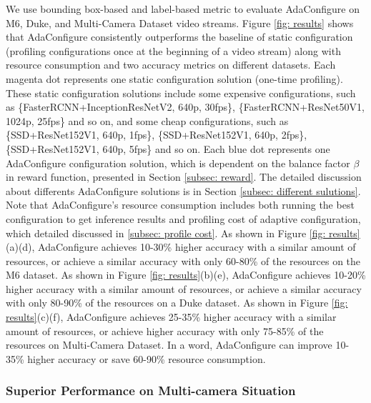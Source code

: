 We use bounding box-based and label-based metric to evaluate AdaConfigure on M6, Duke, and Multi-Camera Dataset video streams. Figure \ref{fig: results} shows that AdaConfigure consistently outperforms the baseline of static configuration (profiling configurations once at the beginning of a video stream) along with resource consumption and two accuracy metrics on different datasets. Each magenta dot represents one static configuration solution (one-time profiling). These static configuration solutions include some expensive configurations, such as \{FasterRCNN+InceptionResNetV2, 640p, 30fps\}, \{FasterRCNN+ResNet50V1, 1024p, 25fps\} and so on, and some cheap configurations, such as \{SSD+ResNet152V1, 640p, 1fps\}, \{SSD+ResNet152V1, 640p, 2fps\}, \{SSD+ResNet152V1, 640p, 5fps\} and so on. Each blue dot represents one AdaConfigure configuration solution, which is dependent on the balance factor $\beta$ in reward function, presented in Section \ref{subsec: reward}. The detailed discussion about differents AdaConfigure solutions is in Section \ref{subsec: different sulutions}. Note that AdaConfigure's resource consumption includes both running the best configuration to get inference results and profiling cost of adaptive configuration, which detailed discussed in \ref{subsec: profile cost}. As shown in Figure \ref{fig: results}(a)(d), AdaConfigure achieves 10-30\% higher accuracy with a similar amount of resources, or achieve a similar accuracy with only 60-80\% of the resources on the M6 dataset. As shown in Figure \ref{fig: results}(b)(e), AdaConfigure achieves 10-20\% higher accuracy with a similar amount of resources, or achieve a similar accuracy with only 80-90\% of the resources on a Duke dataset. As shown in Figure \ref{fig: results}(c)(f), AdaConfigure achieves 25-35\% higher accuracy with a similar amount of resources, or achieve higher accuracy with only 75-85\% of the resources on Multi-Camera Dataset. In a word, AdaConfigure can improve 10-35\% higher accuracy or save 60-90\% resource consumption.

\subsubsection{Superior Performance on Multi-camera Situation}
\label{subsec: superior performance}

